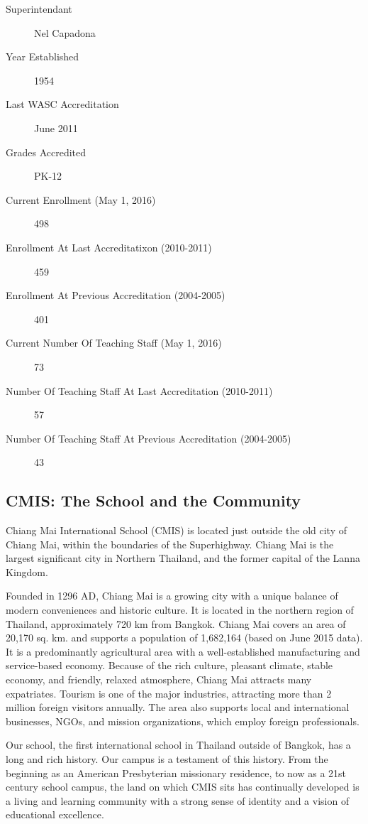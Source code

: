 \begin{description}
\item[Superintendant]
Nel Capadona
\item[Year Established]
1954
\item[Last WASC Accreditation]June 2011
\item[Grades Accredited]PK-12
\item[Current Enrollment (May 1, 2016)] 498
\item[Enrollment At Last Accreditatixon (2010-2011)] 459
\item[Enrollment At Previous Accreditation (2004-2005)]401
\item[Current Number Of Teaching Staff (May 1, 2016)]73
\item[Number Of Teaching Staff At Last Accreditation (2010-2011)]57
\item[Number Of Teaching Staff At Previous Accreditation (2004-2005)]43
\end{description}


\subsection{CMIS: The School and the Community}


Chiang Mai International School (CMIS) is located just outside the old city of Chiang Mai, within the boundaries of the Superhighway. Chiang Mai is the largest significant city in Northern Thailand, and the former capital of the Lanna Kingdom.  

Founded in 1296 AD, Chiang Mai is a growing city with a unique balance of modern conveniences and historic culture.  It is located in the northern region of Thailand, approximately 720 km from Bangkok.  Chiang Mai covers an area of 20,170 sq. km. and supports a population of 1,682,164 (based on June 2015 data).  It is a predominantly agricultural area with a well-established manufacturing and service-based economy.  Because of the rich culture, pleasant climate, stable economy, and friendly, relaxed atmosphere, Chiang Mai attracts many expatriates.  Tourism is one of the major industries, attracting more than 2 million foreign visitors annually.  The area also supports local and international businesses, NGOs, and mission organizations, which employ foreign professionals.

Our school, the first international school in Thailand outside of Bangkok, has a long and rich history.  Our campus is a testament of this history.  From the beginning as an American Presbyterian missionary residence, to now as a 21st century school campus, the land on which CMIS sits has continually developed is a living and learning community with a strong sense of identity and a vision of educational excellence.  

